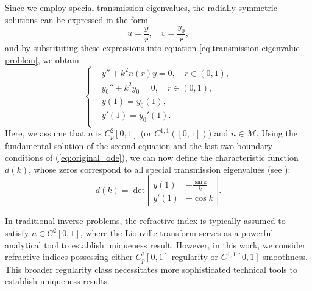 \documentclass[11pt,reqno]{amsart}
\theoremstyle{definition}
\theoremstyle{remark}
\numberwithin{equation}{section}
\begin{document}
Since we employ special transmission eigenvalues, the radially symmetric solutions can be expressed in the form
\begin{equation}\label{eq:radial solutions}
	u = \frac{y}{r}, \quad  v = \frac{y_0}{r},
\end{equation}
and by substituting these expressions into equation \eqref{eq:transmission eigenvalue problem}, we obtain
\begin{equation}\label{eq:original_ode}
	\left\{
	\begin{aligned}
		&y'' + k^2 n(r) y = 0, \quad r \in (0, 1), \\
		&y_0'' + k^2 y_0 = 0, \quad r \in (0, 1), \\
		&y(1) = y_0(1), \\
		&y'(1) = y_0'(1). \\
	\end{aligned}
	\right.
\end{equation}
Here, we assume that $n$ is $C_p^2[0,1]$ (or $C^{1,1}([0,1])$) and $n\in \mathcal{M}$. Using the fundamental solution of the second equation and the last two boundary conditions of (\ref{eq:original_ode}), we can now define the characteristic function $d(k)$, whose zeros correspond to all special transmission eigenvalues (see \cite{CCH16}):
\begin{equation}\label{eq:d(k)}
	d(k) = \det \left|
	\begin{matrix}
		y(1) & -\frac{\sin k}{k} \\
		y'(1) & -\cos k
	\end{matrix}
	\right|.
\end{equation}

In traditional inverse problems, the refractive index is typically assumed to satisfy $n \in C^2[0,1]$, where the Liouville transform serves as a powerful analytical tool to establish uniqueness result. However, in this work, we consider refractive indices possessing either $C_p^2[0,1]$ regularity or $C^{1,1}[0,1]$ smoothness. This broader regularity class necessitates more sophisticated technical tools to establish uniqueness results.
\end{document}
